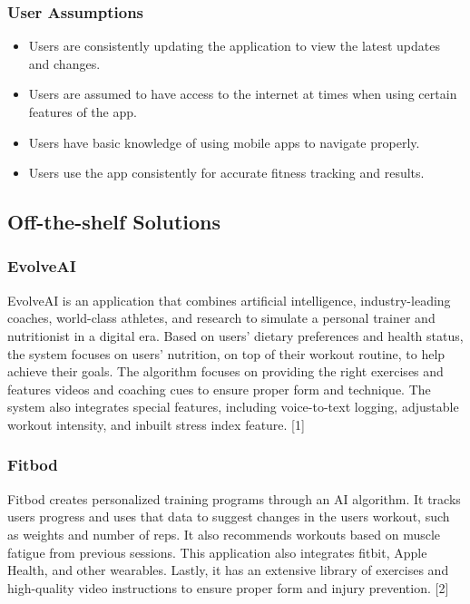 \documentclass[12pt]{article}
\begin{document}
\subsubsection{User Assumptions}
\begin{itemize}
  \item Users are consistently updating the application to view the latest updates and changes.
  \item Users are assumed to have access to the internet at times when using certain features of the app.
  \item Users have basic knowledge of using mobile apps to navigate properly.
  \item Users use the app consistently for accurate fitness tracking and results.
\end{itemize}

\subsection{Off-the-shelf Solutions}

\subsubsection{EvolveAI}
EvolveAI is an application that combines artificial intelligence, industry-leading coaches, world-class athletes, and research to simulate a personal trainer and nutritionist in a digital era. Based on users’ dietary preferences and health status, the system focuses on users’ nutrition, on top of their workout routine, to help achieve their goals. The algorithm focuses on providing the right exercises and features videos and coaching cues to ensure proper form and technique. The system also integrates special features, including voice-to-text logging, adjustable workout intensity, and inbuilt stress index feature. [1]

\subsubsection{Fitbod}
Fitbod creates personalized training programs through an AI algorithm. It tracks users progress and uses that data to suggest changes in the users workout, such as weights and number of reps. It also recommends workouts based on muscle fatigue from previous sessions. This application also integrates fitbit, Apple Health, and other wearables. Lastly, it has an extensive library of exercises and high-quality video instructions to ensure proper form and injury prevention. [2]
\end{document}
